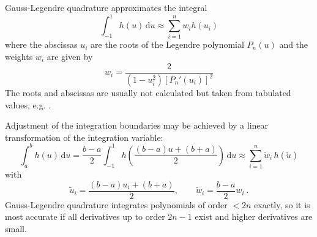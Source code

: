 
Gauss-Legendre quadrature approximates the integral
%
\begin{equation}
    \label{eq:sn_legendre_formula}
    \int_{-1}^1 h(u) \, \mathrm{d}u \approx \sum_{i=1}^n w_i h(u_i)
\end{equation}
%
where the abscissas \(u_i\) are the roots of the Legendre polynomial \(P_n(u)\) and the weights \(w_i\) are given by \cite[25.4.29]{Abr72}
%
\begin{equation}
    \label{eq:sn_legendre_weights}
    w_i = \frac{ 2 }{ (1-u_i^2) [P_n'(u_i)]^2 }
\end{equation}
%
The roots and abscissas are usually not calculated but taken from tabulated values, e.g. \cite{Hol10a}.

Adjustment of the integration boundaries may be achieved by a linear transformation of the integration variable:
%
\begin{equation*}
    \int_a^b h(u) \, \mathrm{d}u =
        \frac{ b-a }{ 2 } \int_{-1}^1 h \left( \frac{ (b-a) u + (b+a) }{ 2 } \right)
        \, \mathrm{d}u \approx
        \sum_{i=1}^n \tilde{w}_i \, h \left( \tilde{u} \right)
\end{equation*}
%
with
%
\begin{equation}
    \label{eq:sn_legendre_transform}
    \tilde{u}_i = \frac{ (b-a) u_i + (b+a) }{ 2 } , \qquad
        \tilde{w}_i = \frac{ b-a }{ 2 } w_i ~.
\end{equation}
%
Gauss-Legendre quadrature integrates polynomials of order \(< 2n\) exactly, so it is most accurate if all derivatives up to order \(2n-1\) exist and higher derivatives are small.
